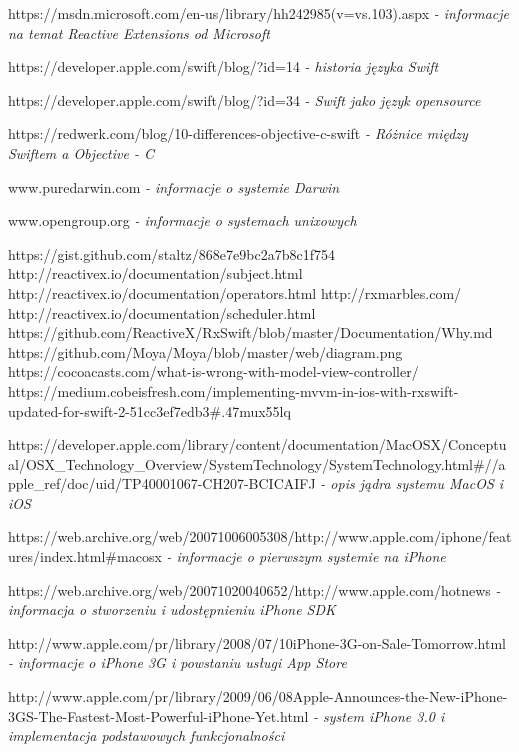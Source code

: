 \documentclass[12pt,oneside,a4paper]{report}
\begin{document}
\begin{thebibliography}{50}
 https://msdn.microsoft.com/en-us/library/hh242985(v=vs.103).aspx
\emph{- informacje na temat Reactive Extensions od Microsoft}

 https://developer.apple.com/swift/blog/?id=14
\emph{- historia języka Swift}

 https://developer.apple.com/swift/blog/?id=34
\emph{- Swift jako język opensource}

 https://redwerk.com/blog/10-differences-objective-c-swift
\emph{- Różnice między Swiftem a Objective - C}

 www.puredarwin.com 
\emph{ - informacje o systemie Darwin}

 www.opengroup.org \emph{ - informacje o systemach unixowych}

 https://gist.github.com/staltz/868e7e9bc2a7b8c1f754
 http://reactivex.io/documentation/subject.html
http://reactivex.io/documentation/operators.html
http://rxmarbles.com/
http://reactivex.io/documentation/scheduler.html
https://github.com/ReactiveX/RxSwift/blob/master/Documentation/Why.md
https://github.com/Moya/Moya/blob/master/web/diagram.png
https://cocoacasts.com/what-is-wrong-with-model-view-controller/
https://medium.cobeisfresh.com/implementing-mvvm-in-ios-with-rxswift-updated-for-swift-2-51cc3ef7edb3\#.47mux55lq


 https://developer.apple.com/library/content/documentation/MacOSX/Conceptual/OSX\_Technology\_Overview/SystemTechnology/SystemTechnology.html\#//apple\_ref/doc/uid/TP40001067-CH207-BCICAIFJ
\emph{ - opis jądra systemu MacOS i iOS}

 https://web.archive.org/web/20071006005308/http://www.apple.com/iphone/features/index.html\#macosx
\emph{ - informacje o pierwszym systemie na iPhone}

 https://web.archive.org/web/20071020040652/http://www.apple.com/hotnews
\emph{ - informacja o stworzeniu i udostępnieniu iPhone SDK}

 http://www.apple.com/pr/library/2008/07/10iPhone-3G-on-Sale-Tomorrow.html
\emph{ - informacje o iPhone 3G i powstaniu usługi App Store}

 http://www.apple.com/pr/library/2009/06/08Apple-Announces-the-New-iPhone-3GS-The-Fastest-Most-Powerful-iPhone-Yet.html
\emph{ - system iPhone 3.0 i implementacja podstawowych funkcjonalności}


\end{thebibliography}
\end{document}
